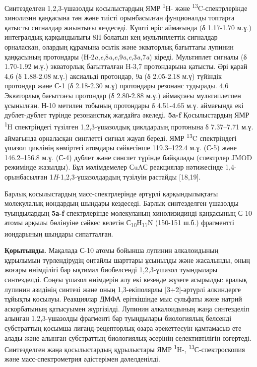 Синтезделген 1,2,3-үшазолды қосылыстардың ЯМР \textsuperscript{1}Н- және
\textsuperscript{13}C-спектрлерінде хинолизин қаңқасына тән және тиісті
орынбасылған фунционалды топтарға қатысты сигналдар жиынтығы кездеседі.
Күшті өріс аймағында (δ 1.17-1.70 м.ү.) интегралдық қарқындылығы 8Н
болатын кең мультиплеттік сигналдар орналасқан, олардың құрамына осьтік
және экваторлық бағыттағы лупинин қаңқасының протондары
(Н-2\emph{a},\emph{e},8\emph{a},\emph{e},9\emph{a},\emph{e},3\emph{a},7\emph{a})
кіреді. Мультиплет сигналы (δ 1.70-1.92 м.ү.) экваторлық бағытталған
H-3,7 протондарына қатысты. Әрі қарай 4,6 (δ 1.88-2.08 м.ү.) аксиальді
протондар, 9а (δ 2.05-2.18 м.ү) түйіндік протондар және С-1 (δ 2.18-2.30
м.ү) протондары резонанс тудырады. 4,6 Экваторлық бағыттағы протондар (δ
2.80-2.88 м.ү.) аймақтағы мультиплетпен ұсынылған. Н-10 метилен тобының
протондары δ 4.51-4.65 м.ү. аймағында екі дублет-дублет түрінде
резонанстық жағдайға әкеледі. \textbf{5a-f} Қосылыстардың ЯМР
\textsuperscript{1}H спектріндегі түзілген 1,2,3-үшазолдық циклдардың
протонына δ 7.37--7.71 м.ү. аймағында орналасқан синглетті сигнал жауап
береді. ЯМР \textsuperscript{13}C спектріндегі үшазол циклінің көміртегі
атомдары сәйкесінше 119.3--122.4 м.ү. (С-5) және 146.2--156.8 м.ү. (С-4)
дублет және синглет түрінде байқалады (спектрлер JMOD режимінде
жазылды). Бұл мәлімдемелер СuAС реакциялар нәтижесінде 1,4-орынбасылған
1\emph{H}-1,2,3-үшазолдардың түзілуін растайды {[}18,19{]}.

Барлық қосылыстардың масс-спектрлерінде әртүрлі қарқындылықтағы
молекулалық иондардың шыңдары кездеседі. Барлық синтезделген үшазолды
туындылардың \textbf{5а-f} спектрлерінде молекуланың хинолизидинді
қаңқасының С-10 атомы арқылы бөлінуіне сәйкес келетін
С\textsubscript{10}H\textsubscript{17}N (150-151 ш.б.) фрагментті
иондарының шыңдары сипатталған.

\textbf{Қорытынды.} Мақалада С-10 атомы бойынша лупинин алкалоидының
құрылымын түрлендірудің оңтайлы шарттары ұсынылды және жасалынды, оның
жоғары өнімділігі бар ықтимал биобелсенді 1,2,3-үшазол туындылары
синтезделді. Соңғы үшазол өнімдерін алу екі кезеңде жүзеге асырылды:
аралық лупинин азидінің синтезі және оның 1,3-екіполярлы
{[}3+2{]}-әртүрлі алкиндерге тұйықты қосылуы. Реакциялар ДМФА
еріткішінде мыс сульфаты және натрий аскорбатының қатысуымен жүргізілді.
Лупинин алкалоидының жаңа синтезделіп алынған 1,2,3-үшазолды фрагменті
бар туындылары биологиялық белсенді субстраттың қосымша
лиганд-рецепторлық өзара әрекеттесуін қамтамасыз ете алады және алынған
субстраттың биологиялық әсерінің селективтілігін өзгертеді. Синтезделген
жаңа қосылыстардың құрылыстары ЯМР \textsuperscript{1}H-,
\textsuperscript{13}С-спектроскопия және масс-спектрометрия әдістерімен
дәлелденілді.

